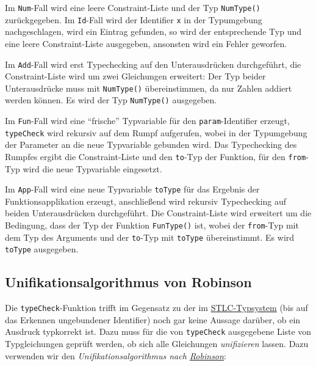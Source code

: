 \documentclass[]{article}
\begin{document}
Im \texttt{Num}-Fall wird eine leere Constraint-Liste und der Typ
\texttt{NumType()} zurückgegeben. Im \texttt{Id}-Fall wird der
Identifier \texttt{x} in der Typumgebung nachgeschlagen, wird ein
Eintrag gefunden, so wird der entsprechende Typ und eine leere
Constraint-Liste ausgegeben, ansonsten wird ein Fehler geworfen.

Im \texttt{Add}-Fall wird erst Typechecking auf den Unterausdrücken
durchgeführt, die Constraint-Liste wird um zwei Gleichungen erweitert:
Der Typ beider Unterausdrücke muss mit \texttt{NumType()}
übereinstimmen, da nur Zahlen addiert werden können. Es wird der Typ
\texttt{NumType()} ausgegeben.

Im \texttt{Fun}-Fall wird eine ``frische'' Typvariable für den
\texttt{param}-Identifier erzeugt, \texttt{typeCheck} wird rekursiv auf
dem Rumpf aufgerufen, wobei in der Typumgebung der Parameter an die neue
Typvariable gebunden wird. Das Typechecking des Rumpfes ergibt die
Constraint-Liste und den \texttt{to}-Typ der Funktion, für den
\texttt{from}-Typ wird die neue Typvariable eingesetzt.

Im \texttt{App}-Fall wird eine neue Typvariable \texttt{toType} für das
Ergebnis der Funktionsapplikation erzeugt, anschließend wird rekursiv
Typechecking auf beiden Unterausdrücken durchgeführt. Die
Constraint-Liste wird erweitert um die Bedingung, dass der Typ der
Funktion \texttt{FunType()} ist, wobei der \texttt{from}-Typ mit dem Typ
des Arguments und der \texttt{to}-Typ mit \texttt{toType} übereinstimmt.
Es wird \texttt{toType} ausgegeben.

\hypertarget{unifikationsalgorithmus-von-robinson}{%
\subsection{Unifikationsalgorithmus von
Robinson}\label{unifikationsalgorithmus-von-robinson}}

Die \texttt{typeCheck}-Funktion trifft im Gegensatz zu der im
\protect\hyperlink{simply-typed-lambda-calculus-stlc}{STLC-Typsystem}
(bis auf das Erkennen ungebundener Identifier) noch gar keine Aussage
darüber, ob ein Ausdruck typkorrekt ist. Dazu muss für die von
\texttt{typeCheck} ausgegebene Liste von Typgleichungen geprüft werden,
ob sich alle Gleichungen \emph{unifizieren} lassen. Dazu verwenden wir
den \emph{Unifikationsalgorithmus nach
\href{https://de.wikipedia.org/wiki/John_Alan_Robinson}{Robinson}}:
\end{document}
